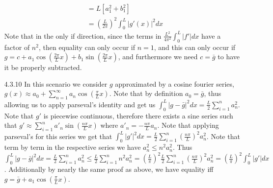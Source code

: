 \documentclass[12pt, letterpaper]{article}
\begin{document}
\begin{enumerate}
\begin{align*}
	 &= L[a_1^2 + b_1^2]\\
	 &= \left(\frac{L}{2\pi}\right)^2 \int_0^L |g'(x)|^2 dx
	 \end{align*}
	 Note that in the only if direction, since the terms in 
	 $\frac{L^2}{4\pi^2} \int_0^L |f'|dx$ have a factor of $n^2$, 
	 then equality can only occur if $n=1$, and this can only occur 
	 if $g = c + a_1 \cos(\frac{2\pi}{L}x) + b_1 \sin(\frac{2\pi}{L}x)$,
	 and furthermore we need $c = \bar{g}$ to have it be properly 
	 subtracted.  
	\item[4.3.10] In this scenario we consider $g$ approximated by 
	a cosine fourier series, $g(x) \approx a_0 + \sum_{n=1}^\infty a_n \cos \left(\frac{\pi}{L}x\right) $.  Note that by definition $a_0 = \bar{g}$,
	thus allowing us to apply parseval's identity and get us 
	$\int_0^L |g - \bar{g}|^2 dx = \frac{L}{2} \sum_{i=1}^n a_n^2 $.
	Note that $g'$ is piecewise continuous, therefore there exists a 
	sine series such that $g' \approx \sum_{i=1}^n a'_n \sin\left(\frac{n\pi}{L}x\right)$ where $a'_n = -\frac{n\pi}{L}a_n $.
	Note that applying parseval's for this series we get that 
	$\int_0^L |g'|^2 dx = \frac{L}{2}\sum_{i=1}^n \left(\frac{n\pi}{L} \right)^2 a_n^2$.  Note that term by term in the respective series we 
	have $a_n^2 \leq n^2 a_n^2$.  Thus 
	$\int_0^L |g-\bar{g}|^2 dx = \frac{L}{2} \sum_{i=1}^n a_n^2 \leq \frac{L}{2}\sum_{i=1}^n n^2 a_n^2 = \left(\frac{L}{\pi} \right)^2 \frac{L}{2}\sum_{i=1}^n \left(\frac{n\pi}{L} \right)^2 a_n^2
	= \left(\frac{L}{\pi} \right)^2 \int_0^L |g'|dx$.  Additionally
	by nearly the same proof as above, we have equality iff
	$g = \bar{g} + a_1 \cos(\frac{\pi}{L}x)$.  
\end{enumerate}
\end{document}
